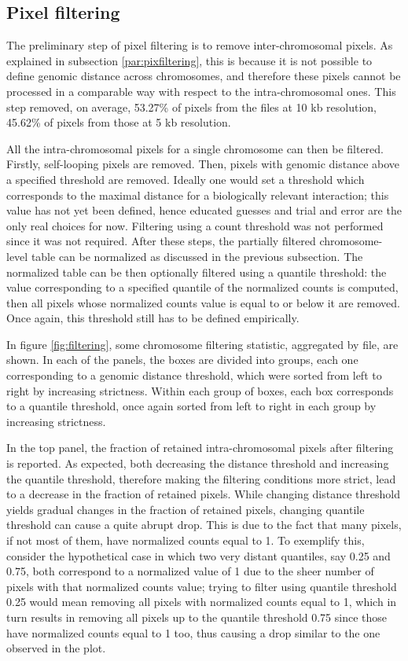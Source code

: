 \subsection{Pixel filtering}

The preliminary step of pixel filtering is to remove inter-chromosomal pixels. As explained in subsection \ref{par:pixfiltering}, this is because it is not possible to define genomic distance across chromosomes, and therefore these pixels cannot be processed in a comparable way with respect to the intra-chromosomal ones. This step removed, on average, 53.27\% of pixels from the files at 10 kb resolution, 45.62\% of pixels from those at 5 kb resolution.

All the intra-chromosomal pixels for a single chromosome can then be filtered. Firstly, self-looping pixels are removed. Then, pixels with genomic distance above a specified threshold are removed. Ideally one would set a threshold which corresponds to the maximal distance for a biologically relevant interaction; this value has not yet been defined, hence educated guesses and trial and error are the only real choices for now. Filtering using a count threshold was not performed since it was not required. After these steps, the partially filtered chromosome-level table can be normalized as discussed in the previous subsection. The normalized table can be then optionally filtered using a quantile threshold: the value corresponding to a specified quantile of the normalized counts is computed, then all pixels whose normalized counts value is equal to or below it are removed. Once again, this threshold still has to be defined empirically. 

In figure \ref{fig:filtering}, some chromosome filtering statistic, aggregated by file, are shown. In each of the panels, the boxes are divided into groups, each one corresponding to a genomic distance threshold, which were sorted from left to right by increasing strictness. Within each group of boxes, each box corresponds to a quantile threshold, once again sorted from left to right in each group by increasing strictness.

In the top panel, the fraction of retained intra-chromosomal pixels after filtering is reported. As expected, both decreasing the distance threshold and increasing the quantile threshold, therefore making the filtering conditions more strict, lead to a decrease in the fraction of retained pixels. While changing distance threshold yields gradual changes in the fraction of retained pixels, changing quantile threshold can cause a quite abrupt drop. This is due to the fact that many pixels, if not most of them, have normalized counts equal to 1. To exemplify this, consider the hypothetical case in which two very distant quantiles, say 0.25 and 0.75, both correspond to a normalized value of 1 due to the sheer number of pixels with that normalized counts value; trying to filter using quantile threshold 0.25 would mean removing all pixels with normalized counts equal to 1, which in turn results in removing all pixels up to the quantile threshold 0.75 since those have normalized counts equal to 1 too, thus causing a drop similar to the one observed in the plot.

